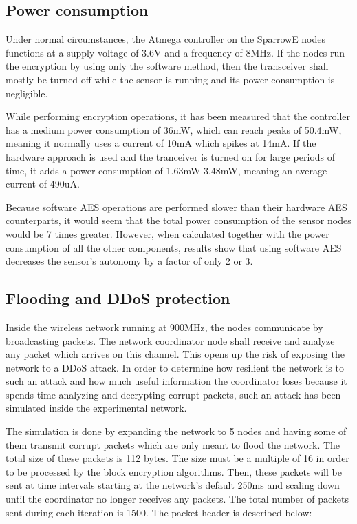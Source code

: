 \subsection{Power consumption}

Under normal circumstances, the Atmega controller on the SparrowE nodes functions at a 
supply voltage of 3.6V and a frequency of 8MHz. If the nodes run the encryption by using 
only the software method, then the transceiver shall mostly be turned off while the sensor is 
running and its power consumption is negligible.

While performing encryption operations, it has been measured that the controller has a medium 
power consumption of 36mW, which can reach peaks of 50.4mW, meaning it normally uses a current 
of 10mA which spikes at 14mA. If the hardware approach is used and the tranceiver is turned on 
for large periods of time, it adds a power consumption of 1.63mW-3.48mW, meaning an average 
current of 490uA.

Because software AES operations are performed slower than their hardware AES counterparts, 
it would seem that the total power consumption of the sensor nodes would be 7 times greater.
However, when calculated together with the power consumption of all the other components, 
results show that using software AES decreases the sensor's autonomy by a factor of only 
2 or 3.

\subsection{Flooding and DDoS protection}

Inside the wireless network running at 900MHz, the nodes communicate by broadcasting packets.
The network coordinator node shall receive and analyze any packet which arrives on this channel.
This opens up the risk of exposing the network to a DDoS attack. In order to determine how 
resilient the network is to such an attack and how much useful information the coordinator 
loses because it spends time analyzing and decrypting corrupt packets, such an attack has been 
simulated inside the experimental network.

The simulation is done by expanding the network to 5 nodes and having some of them transmit 
corrupt packets which are only meant to flood the network. The total size of these packets is 
112 bytes. The size must be a multiple of 16 in order to be processed by the block encryption 
algorithms. Then, these packets will be sent at time intervals starting at the network's default 
250ms and scaling down until the coordinator no longer receives any packets. The total number 
of packets sent during each iteration is 1500. The packet header is described below:

